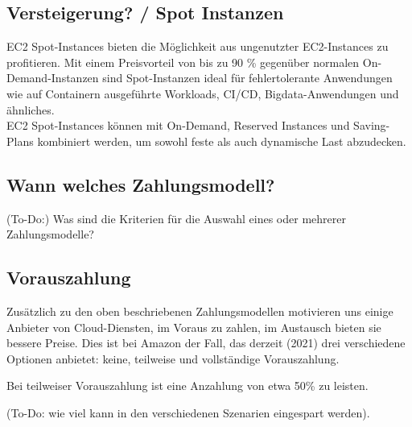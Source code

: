 

\subsection{Versteigerung? / Spot Instanzen }
EC2 Spot-Instances bieten die Möglichkeit aus ungenutzter EC2-Instances zu profitieren.
Mit einem Preisvorteil von bis zu 90 \% gegenüber normalen On-Demand-Instanzen sind Spot-Instanzen ideal für fehlertolerante Anwendungen wie auf Containern ausgeführte Workloads, CI/CD, Bigdata-Anwendungen und ähnliches.
\\
EC2 Spot-Instances können mit On-Demand, Reserved Instances und Saving-Plans kombiniert werden, um sowohl feste als auch dynamische Last abzudecken.
\subsection{Wann welches Zahlungsmodell?}
(To-Do:) Was sind die Kriterien für die Auswahl eines oder mehrerer Zahlungsmodelle?



\subsection{Vorauszahlung}
Zusätzlich zu den oben beschriebenen Zahlungsmodellen motivieren uns einige Anbieter von Cloud-Diensten, im Voraus zu zahlen, im Austausch bieten sie bessere Preise. Dies ist bei Amazon der Fall, das derzeit (2021) drei verschiedene Optionen anbietet: keine, teilweise und vollständige Vorauszahlung.

Bei teilweiser Vorauszahlung ist eine Anzahlung von etwa 50\% zu leisten.

(To-Do: wie viel kann in den verschiedenen Szenarien eingespart werden).
